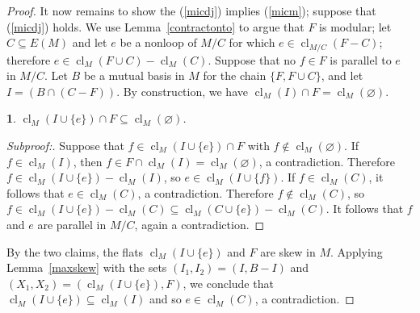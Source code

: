 \documentclass{amsart}
\theoremstyle{plain}
\newtheorem{claim}{}[theorem]
\theoremstyle{definition}
\DeclareMathOperator{\cl}{cl}
\newcommand{\con}{/}
\newcommand{\es}{\varnothing}
\renewcommand{\ss}{\subseteq}
\newenvironment{subproof}[1][\proofname]{%
  \renewcommand{\qedsymbol}{$\blacksquare$}%
  \begin{proof}[Subproof:]%
}{%
  \end{proof}%
}
\begin{document}
\begin{proof}
  It now remains to show the (\ref{micdj}) implies (\ref{micm}); suppose that (\ref{micdj}) holds. 
  We use Lemma~\ref{contractonto} to argue that $F$ is modular; let $C \ss E(M)$
  and let $e$ be a nonloop of $M \con C$ for which $e \in \cl_{M \con C}(F-C)$;
  therefore $e \in \cl_M(F \cup C) - \cl_M(C)$.  
  Suppose that no $f \in F$ is parallel to $e$ in $M \con C$. 
  Let $B$ be a mutual basis in $M$ for the chain $\{F, F \cup C\}$, 
  and let $I = (B \cap (C - F))$. By construction, we have $\cl_M(I) \cap F = \cl_M(\es)$. 
  \begin{claim}\label{techss}
    $\cl_M(I \cup \{e\}) \cap F \ss \cl_M(\es)$.
  \end{claim}
  \begin{subproof}
    Suppose that $f \in \cl_M(I \cup \{e\}) \cap F$ with $f \notin \cl_M(\es)$. 
    If $f \in \cl_M(I)$, then $f \in F \cap \cl_M(I) = \cl_M(\es)$, a contradiction. 
    Therefore $f \in \cl_M(I \cup \{e\}) - \cl_M(I)$, so $e \in \cl_M(I \cup \{f\})$. 
    If $f \in \cl_M(C)$, it follows that $e \in \cl_M(C)$, a contradiction. 
    Therefore $f \notin \cl_M(C)$, so $f \in \cl_M(I \cup \{e\}) - \cl_M(C) \ss \cl_M(C \cup \{e\}) - \cl_M(C)$. 
    It follows that $f$ and $e$ are parallel in $M \con C$, again a contradiction.
  \end{subproof}
  By the two claims, the flats $\cl_M(I \cup \{e\})$ and $F$ are skew in $M$. 
  Applying Lemma~\ref{maxskew} with the sets $(I_1, I_2) = (I, B-I)$ and $(X_1, X_2) = (\cl_M(I \cup \{e\}), F)$, 
  we conclude that $\cl_M(I \cup \{e\}) \ss \cl_M(I)$ and so $e \in \cl_M(C)$, 
  a contradiction. 
\end{proof}
\end{document}
